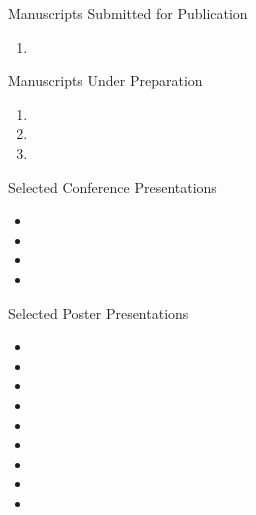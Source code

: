 \documentclass{resume} %
\begin{document}
\begin{rSection}{Manuscripts Submitted for Publication}
  \begin{enumerate}
    \item {}
  \end{enumerate}
\end{rSection}

\begin{rSection}{Manuscripts Under Preparation}
  \begin{enumerate}
  \item {}
  \item {}
  \item {}
  \end{enumerate}
\end{rSection}
\begin{rSection}{Selected Conference Presentations}
  \begin{itemize}
    \item {}
    \item {}
    \item {}
    \item {}
  \end{itemize}
\end{rSection}
\begin{rSection}{Selected Poster Presentations}
  \begin{itemize}
    \setlength\itemsep{0em}
    \item {}
    \item {}
    \item {}
    \item {}
    \item {}
    \item {}
    \item {}
    \item {}
    \item {}
  \end{itemize}
\end{rSection}
\end{document}
